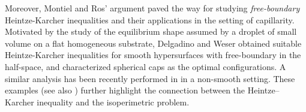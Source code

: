 \documentclass[11pt]{amsart}
\theoremstyle{definition}
\theoremstyle{remark}
\numberwithin{equation}{section}
\begin{document}
	Moreover, Montiel and Ros' argument paved the way for studying \emph{free-boundary} Heintze-Karcher inequalities and their applications in the setting of capillarity. Motivated by the study of the equilibrium shape assumed by a droplet of small volume on a flat homogeneous substrate, Delgadino and Weser \cite{MR4783570} obtained suitable Heintze-Karcher inequalities for smooth hypersurfaces with free-boundary in the half-space, and characterized spherical caps as the optimal configurations.
	A similar analysis has been recently performed in \cite{derosa2025rigiditycriticalpointshydrophobic} in a non-smooth setting.
	These examples (see also \cite{MR4562813,MR4817296,MR4567578}) further highlight the connection between the Heintze–Karcher inequality and the isoperimetric problem.\\
	
\end{document}
